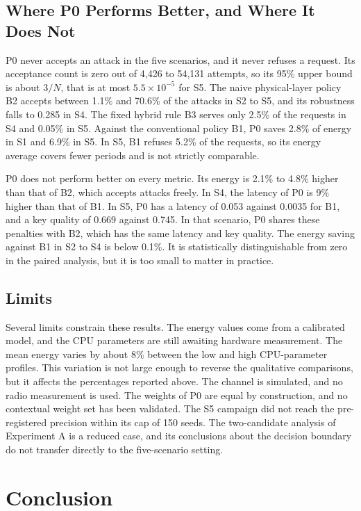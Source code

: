 \documentclass[conference]{IEEEtran}
\begin{document}
\subsection{Where P0 Performs Better, and Where It Does Not}

P0 never accepts an attack in the five scenarios, and it never refuses a request. Its acceptance count is zero out of 4{,}426 to 54{,}131 attempts, so its 95\% upper bound is about $3/N$, that is at most $5.5\times10^{-5}$ for S5. The naive physical-layer policy B2 accepts between 1.1\% and 70.6\% of the attacks in S2 to S5, and its robustness falls to 0.285 in S4. The fixed hybrid rule B3 serves only 2.5\% of the requests in S4 and 0.05\% in S5. Against the conventional policy B1, P0 saves 2.8\% of energy in S1 and 6.9\% in S5. In S5, B1 refuses 5.2\% of the requests, so its energy average covers fewer periods and is not strictly comparable.

P0 does not perform better on every metric. Its energy is 2.1\% to 4.8\% higher than that of B2, which accepts attacks freely. In S4, the latency of P0 is 9\% higher than that of B1. In S5, P0 has a latency of 0.053 against 0.0035 for B1, and a key quality of 0.669 against 0.745. In that scenario, P0 shares these penalties with B2, which has the same latency and key quality. The energy saving against B1 in S2 to S4 is below 0.1\%. It is statistically distinguishable from zero in the paired analysis, but it is too small to matter in practice.

\subsection{Limits}

Several limits constrain these results. The energy values come from a calibrated model, and the CPU parameters are still awaiting hardware measurement. The mean energy varies by about 8\% between the low and high CPU-parameter profiles. This variation is not large enough to reverse the qualitative comparisons, but it affects the percentages reported above. The channel is simulated, and no radio measurement is used. The weights of P0 are equal by construction, and no contextual weight set has been validated. The S5 campaign did not reach the pre-registered precision within its cap of 150 seeds. The two-candidate analysis of Experiment A is a reduced case, and its conclusions about the decision boundary do not transfer directly to the five-scenario setting.

\section{Conclusion}
\end{document}
